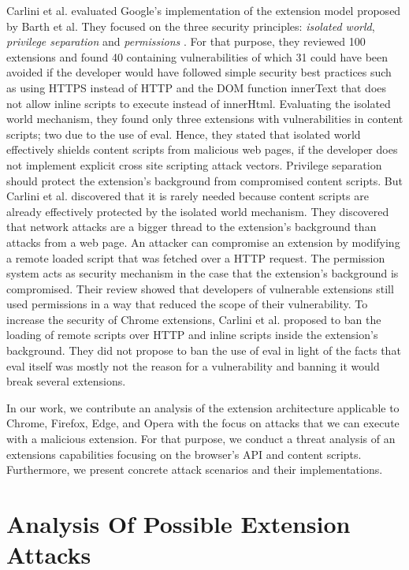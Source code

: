 	Carlini et al. evaluated Google's implementation of the extension model proposed by Barth et al. They focused on the three security principles: \textit{isolated world}, \textit{privilege separation} and \textit{permissions} \cite{Carlini:2012:EGC:2362793.2362800, Barth10protectingbrowsers}. For that purpose, they reviewed 100 extensions and found 40 containing vulnerabilities of which 31 could have been avoided if the developer would have followed simple security best practices such as using HTTPS instead of HTTP and the DOM function innerText that does not allow inline scripts to execute instead of innerHtml. Evaluating the isolated world mechanism, they found only three extensions with vulnerabilities in content scripts; two due to the use of eval. Hence, they stated that isolated world effectively shields content scripts from malicious web pages, if the developer does not implement explicit cross site scripting attack vectors. Privilege separation should protect the extension's background from compromised content scripts. But Carlini et al. discovered that it is rarely needed because content scripts are already effectively protected by the isolated world mechanism. They discovered that network attacks are a bigger thread to the extension's background than attacks from a web page. An attacker can compromise an extension by modifying a remote loaded script that was fetched over a HTTP request. The permission system acts as security mechanism in the case that the extension's background is compromised. Their review showed that developers of vulnerable extensions still used permissions in a way that reduced the scope of their vulnerability. To increase the security of Chrome extensions, Carlini et al. proposed to ban the loading of remote scripts over HTTP and inline scripts inside the extension's background. They did not propose to ban the use of eval in light of the facts that eval itself was mostly not the reason for a vulnerability and banning it would break several extensions. 
	
	In our work, we contribute an analysis of the extension architecture applicable to Chrome, Firefox, Edge, and Opera with the focus on attacks that we can execute with a malicious extension. For that purpose, we conduct a threat analysis of an extensions capabilities focusing on the browser's API and content scripts. Furthermore, we present concrete attack scenarios and their implementations. %
	
	
\section{Analysis Of Possible Extension Attacks}

